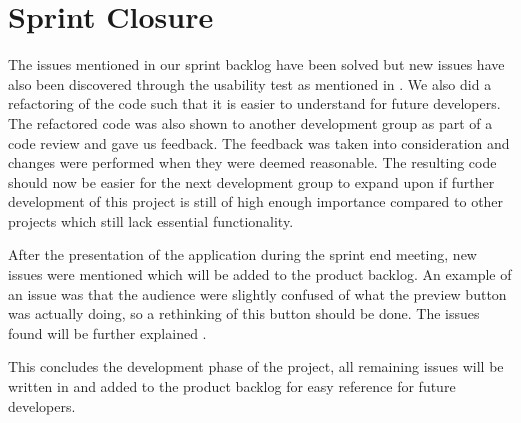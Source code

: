 
\section{Sprint Closure}
The issues mentioned in our sprint backlog have been solved but new issues have also been discovered through the usability test as mentioned in . 
We also did a refactoring of the code such that it is easier to understand for future developers.
The refactored code was also shown to another development group as part of a code review and gave us feedback.
The feedback was taken into consideration and changes were performed when they were deemed reasonable.
The resulting code should now be easier for the next development group to expand upon if further development of this project is still of high enough importance compared to other projects which still lack essential functionality.

After the presentation of the application during the sprint end meeting, new issues were mentioned which will be added to the product backlog.
An example of an issue was that the audience were slightly confused of what the preview button was actually doing, so a rethinking of this button should be done.
The issues found will be further explained .

This concludes the development phase of the project, all remaining issues will be written in  and added to the product backlog for easy reference for future developers.